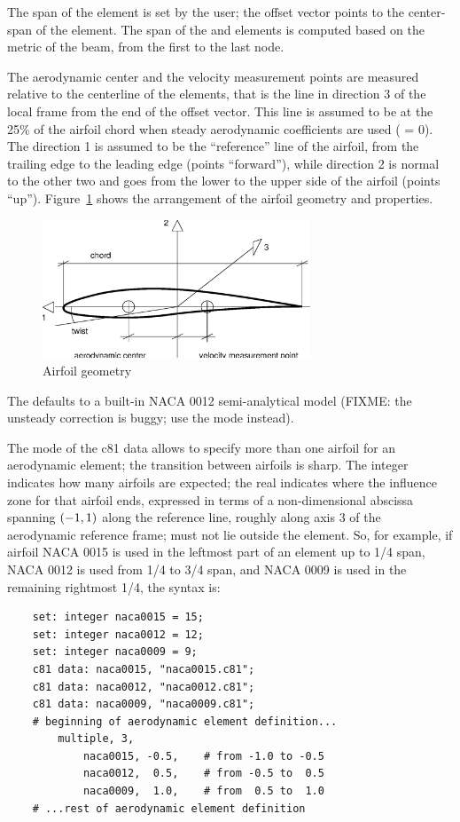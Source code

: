 The span of the  element is set by the user;
the offset vector points to the center-span of the element.
The span of the  and  elements
is computed based on the metric of the beam, from the first to the last node.

The aerodynamic center and the velocity measurement points are measured
relative to the centerline of the elements, that is the line in direction 3
of the local frame from the end of the offset vector.
This line is assumed to be at the 25\% of the airfoil chord when steady
aerodynamic coefficients are used ( = 0).
The direction 1 is assumed to be the ``reference'' line of the airfoil, 
from the trailing edge to the leading edge (points ``forward''),
while direction 2 is normal to the other two and goes from the lower 
to the upper side of the airfoil (points ``up''). 
Figure~\ref{fig:AIRFOIL} shows the arrangement of the airfoil geometry 
and properties.

\begin{figure}[h]
  \centering
    \includegraphics[width=80mm]{airfoil}
  \caption{Airfoil geometry}\label{fig:AIRFOIL}
\end{figure}

The  defaults to a built-in NACA 0012 semi-analytical
model (FIXME: the unsteady correction is buggy; use the  
mode instead).

The  mode of the c81 data allows to specify
more than one airfoil for an aerodynamic element; the transition
between airfoils is sharp.
The integer  indicates how many airfoils are expected;
the real  indicates where the influence zone for that
airfoil ends, expressed in terms of a non-dimensional abscissa spanning 
$\left( -1,1 \right)$ along the reference line, roughly along axis 3 
of the aerodynamic reference frame;  must not lie outside
the element.
So, for example, if airfoil NACA 0015 is used in the leftmost part
of an element up to 1/4 span, NACA 0012 is used from 1/4 to 3/4 span,
and NACA 0009 is used in the remaining rightmost 1/4, the syntax is:
\begin{verbatim}
    set: integer naca0015 = 15;
    set: integer naca0012 = 12;
    set: integer naca0009 = 9;
    c81 data: naca0015, "naca0015.c81";
    c81 data: naca0012, "naca0012.c81";
    c81 data: naca0009, "naca0009.c81";
    # beginning of aerodynamic element definition...
        multiple, 3,
            naca0015, -0.5,    # from -1.0 to -0.5
            naca0012,  0.5,    # from -0.5 to  0.5
            naca0009,  1.0,    # from  0.5 to  1.0
    # ...rest of aerodynamic element definition
\end{verbatim}

